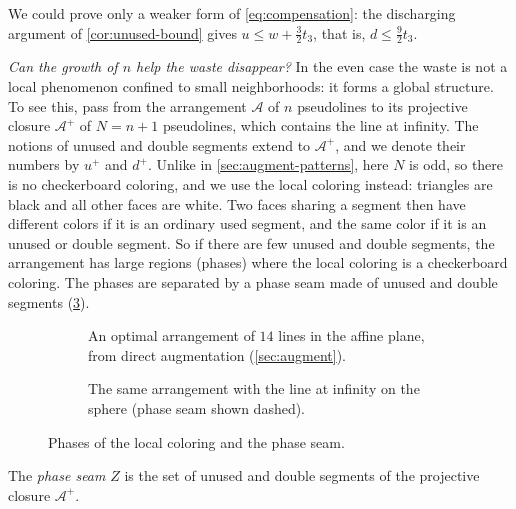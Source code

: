 We could prove only a weaker form of \eqref{eq:compensation}: the discharging argument of \cref{cor:unused-bound} gives $u\le w+\tfrac32t_3$, that is, $d\le\tfrac92t_3$.

\emph{Can the growth of $n$ help the waste disappear?} In the even case the waste is not a local phenomenon confined to small neighborhoods: it forms a global structure. To see this, pass from the arrangement $\mathcal{A}$ of $n$ pseudolines to its projective closure $\mathcal{A}^+$ of $N=n+1$ pseudolines, which contains the line at infinity. The notions of unused and double segments extend to $\mathcal{A}^+$, and we denote their numbers by $u^+$ and $d^+$. Unlike in \cref{sec:augment-patterns}, here $N$ is odd, so there is no checkerboard coloring, and we use the local coloring instead: triangles are black and all other faces are white. Two faces sharing a segment then have different colors if it is an ordinary used segment, and the same color if it is an unused or double segment. So if there are few unused and double segments, the arrangement has large regions (phases) where the local coloring is a checkerboard coloring. The phases are separated by a phase seam made of unused and double segments (\cref{fig:phase-seam}).

\begin{figure}[p]
\centering
\captionsetup[sub]{skip=-2pt}%
\begin{subfigure}[t]{\linewidth}

\caption{An optimal arrangement of $14$ lines in the affine plane, from direct augmentation (\cref{sec:augment}).}
\label{fig:phase-seam-plane}
\end{subfigure}

\vspace{18pt}
\begin{subfigure}[t]{\linewidth}
\centering
\begin{minipage}{0.65\linewidth}%

\end{minipage}
\caption{The same arrangement with the line at infinity on the sphere (phase seam shown dashed).}
\label{fig:phase-seam-sphere}
\end{subfigure}
\caption{Phases of the local coloring and the phase seam.}
\label{fig:phase-seam}
\end{figure}

\begin{definition}\label{def:seam}
The \emph{phase seam} $Z$ is the set of unused and double segments of the projective closure $\mathcal A^+$.
\end{definition}

